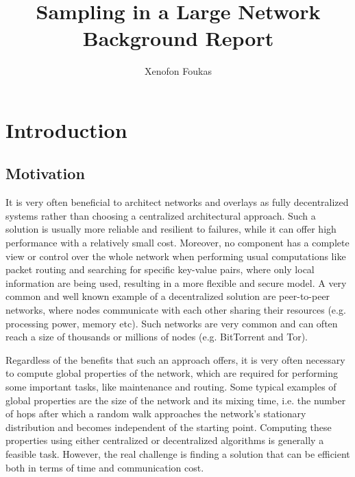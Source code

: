 \documentclass[MSc]{icldt}
\title{Sampling in a Large Network\\Background Report}
\author{Xenofon Foukas}
\date{}
\begin{document}
\maketitle


\tableofcontents
\chapter{Introduction}

\section{Motivation}


It is very often beneficial to architect networks and overlays as fully decentralized systems rather than choosing a centralized architectural approach. Such a solution is usually more reliable and resilient to failures, while it can offer high performance with a relatively small cost. Moreover, no component has a complete view or control over the whole network when performing usual computations like packet routing and searching for specific key-value pairs, where only local information are being used, resulting in a more flexible and secure model. A very common and well known example of a decentralized solution are peer-to-peer networks, where nodes communicate with each other sharing their resources (e.g. processing power, memory etc). Such networks are very common and can often reach a size of thousands or millions of nodes (e.g. BitTorrent and Tor).

Regardless of the benefits that such an approach offers, it is very often necessary to compute global properties of the network, which are required for performing some important tasks, like maintenance and routing. Some typical examples of global properties are the size of the network and its mixing time, i.e. the number of hops after which a random walk approaches the network's stationary distribution and becomes independent of the starting point. Computing these properties using either centralized or decentralized algorithms is generally a feasible task. However, the real challenge is finding a solution that can be efficient both in terms of time and communication cost.
\end{document}
